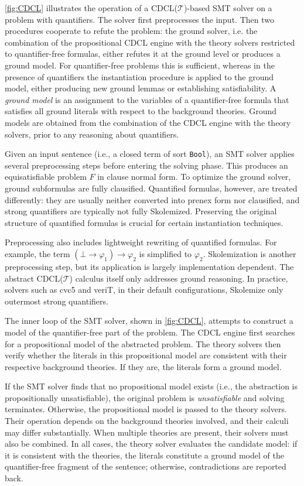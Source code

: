 \cref{fig:CDCL} illustrates the operation of a CDCL($\mathcal{T}$)-based SMT solver on a problem with quantifiers.
The solver first preprocesses the input.
Then two procedures cooperate to refute the problem: the ground solver, i.e. the combination of the propositional CDCL engine with the theory solvers restricted to quantifier-free formulas, either refutes it at the ground level or produces a ground model.
For quantifier-free problems this is sufficient, whereas in the presence of quantifiers the instantiation procedure is applied to the ground model, either producing new ground lemmas or establishing satisfiability.
A \emph{ground model} is an assignment to the variables of a quantifier-free formula that satisfies all ground literals with respect to the background theories.
Ground models are obtained from the combination of the CDCL engine with the theory solvers, prior to any reasoning about quantifiers.

Given an input sentence (i.e., a closed term of sort \texttt{Bool}), an SMT solver applies several preprocessing steps before entering the solving phase.
This produces an equisatisfiable problem $F$ in clause normal form.
To optimize the ground solver, ground subformulas are fully clausified.
Quantified formulas, however, are treated differently: they are usually neither converted into prenex form nor clausified, and strong quantifiers \cite{BAAZ2001273} are typically not fully Skolemized.
Preserving the original structure of quantified formulas is crucial for certain instantiation techniques.


Preprocessing also includes lightweight rewriting of quantified formulas.
For example, the term $(\bot \to \varphi_1) \to \varphi_2$ is simplified to $\varphi_2$.
Skolemization is another preprocessing step, but its application is largely implementation dependent.
The abstract CDCL($\mathcal{T}$) calculus itself only addresses ground reasoning.
In practice, solvers such as cvc5 and veriT, in their default configurations, Skolemize only outermost strong quantifiers.


The inner loop of the SMT solver, shown in \cref{fig:CDCL}, attempts to construct a model of the quantifier-free part of the problem.
The CDCL engine first searches for a propositional model of the abstracted problem.
The theory solvers then verify whether the literals in this propositional model are consistent with their respective background theories.
If they are, the literals form a ground model.


If the SMT solver finds that no propositional model exists (i.e., the abstraction is propositionally unsatisfiable), the original problem is \emph{unsatisfiable} and solving terminates.
Otherwise, the propositional model is passed to the theory solvers.
Their operation depends on the background theories involved, and their calculi may differ substantially.
When multiple theories are present, their solvers must also be combined.
In all cases, the theory solver evaluates the candidate model: if it is consistent with the theories, the literals constitute a ground model of the quantifier-free fragment of the sentence; otherwise, contradictions are reported back.
